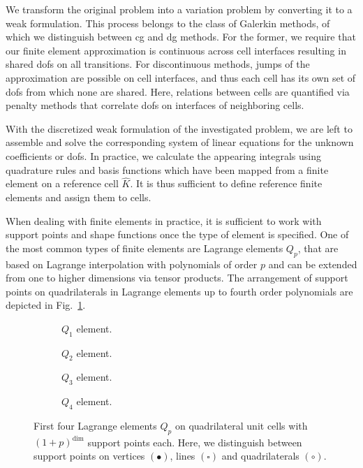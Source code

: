 We transform the original problem into a variation problem by converting it to a weak formulation. This process belongs to the class of Galerkin methods, of which we distinguish between \gls{cg} and \gls{dg} methods. For the former, we require that our finite element approximation is continuous across cell interfaces resulting in shared \glspl{dof} on all transitions. For discontinuous methods, jumps of the approximation are possible on cell interfaces, and thus each cell has its own set of \glspl{dof} from which none are shared. Here, relations between cells are quantified via penalty methods that correlate \glspl{dof} on interfaces of neighboring cells.

With the discretized weak formulation of the investigated problem, we are left to assemble and solve the corresponding system of linear equations for the unknown coefficients or \glspl{dof}. In practice, we calculate the appearing integrals using quadrature rules and basis functions which have been mapped from a finite element on a reference cell $\widehat{K}$. It is thus sufficient to define reference finite elements and assign them to cells.

When dealing with finite elements in practice, it is sufficient to work with support points and shape functions once the type of element is specified. One of the most common types of finite elements are Lagrange elements $Q_p$, that are based on Lagrange interpolation with polynomials of order $p$ and can be extended from one to higher dimensions via tensor products. The arrangement of support points on quadrilaterals in Lagrange elements up to fourth order polynomials are depicted in Fig.~\ref{fig:lagrange}.

\begin{figure}
\begin{subfigure}{.24\textwidth}
  \centering
  
  \caption{$Q_1$ element.}
\end{subfigure}
\begin{subfigure}{.24\textwidth}
  \centering
  
  \caption{$Q_2$ element.}
\end{subfigure}
\begin{subfigure}{.24\textwidth}
  \centering
  
  \caption{$Q_3$ element.}
\end{subfigure}
\begin{subfigure}{.24\textwidth}
  \centering
  
  \caption{$Q_4$ element.}
\end{subfigure}
\caption[Lagrange elements $Q_p$ on quadrilateral unit cells.]{First four Lagrange elements $Q_p$ on quadrilateral unit cells with $(1+p)^\text{dim}$ support points each. Here, we distinguish between support points on vertices $(\bullet)$, lines $(\square)$ and quadrilaterals $(\circ)$.}
\label{fig:lagrange}
\end{figure}

